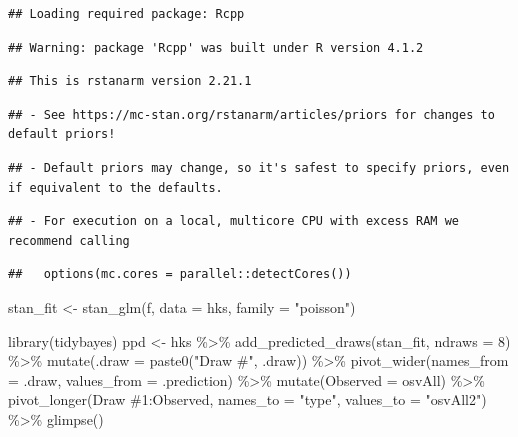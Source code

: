 \documentclass[
]{book}
\newenvironment{Shaded}{\begin{snugshade}}{\end{snugshade}}
\newcommand{\AttributeTok}[1]{\textcolor[rgb]{0.77,0.63,0.00}{#1}}
\newcommand{\DecValTok}[1]{\textcolor[rgb]{0.00,0.00,0.81}{#1}}
\newcommand{\FunctionTok}[1]{\textcolor[rgb]{0.00,0.00,0.00}{#1}}
\newcommand{\NormalTok}[1]{#1}
\newcommand{\OtherTok}[1]{\textcolor[rgb]{0.56,0.35,0.01}{#1}}
\newcommand{\SpecialCharTok}[1]{\textcolor[rgb]{0.00,0.00,0.00}{#1}}
\newcommand{\StringTok}[1]{\textcolor[rgb]{0.31,0.60,0.02}{#1}}
\begin{document}
\begin{verbatim}
## Loading required package: Rcpp
\end{verbatim}

\begin{verbatim}
## Warning: package 'Rcpp' was built under R version 4.1.2
\end{verbatim}

\begin{verbatim}
## This is rstanarm version 2.21.1
\end{verbatim}

\begin{verbatim}
## - See https://mc-stan.org/rstanarm/articles/priors for changes to default priors!
\end{verbatim}

\begin{verbatim}
## - Default priors may change, so it's safest to specify priors, even if equivalent to the defaults.
\end{verbatim}

\begin{verbatim}
## - For execution on a local, multicore CPU with excess RAM we recommend calling
\end{verbatim}

\begin{verbatim}
##   options(mc.cores = parallel::detectCores())
\end{verbatim}

\begin{Shaded}
\begin{Highlighting}[]
\NormalTok{stan\_fit }\OtherTok{\textless{}{-}} \FunctionTok{stan\_glm}\NormalTok{(f, }\AttributeTok{data =}\NormalTok{ hks, }\AttributeTok{family =} \StringTok{"poisson"}\NormalTok{)}

\FunctionTok{library}\NormalTok{(tidybayes)}
\NormalTok{ppd }\OtherTok{\textless{}{-}}\NormalTok{ hks }\SpecialCharTok{\%\textgreater{}\%}
  \FunctionTok{add\_predicted\_draws}\NormalTok{(stan\_fit, }\AttributeTok{ndraws =} \DecValTok{8}\NormalTok{) }\SpecialCharTok{\%\textgreater{}\%} 
  \FunctionTok{mutate}\NormalTok{(}\AttributeTok{.draw =} \FunctionTok{paste0}\NormalTok{(}\StringTok{"Draw \#"}\NormalTok{, .draw)) }\SpecialCharTok{\%\textgreater{}\%} 
  \FunctionTok{pivot\_wider}\NormalTok{(}\AttributeTok{names\_from =}\NormalTok{ .draw, }\AttributeTok{values\_from =}\NormalTok{ .prediction) }\SpecialCharTok{\%\textgreater{}\%}
  \FunctionTok{mutate}\NormalTok{(}\StringTok{\textasciigrave{}}\AttributeTok{Observed}\StringTok{\textasciigrave{}} \OtherTok{=}\NormalTok{ osvAll) }\SpecialCharTok{\%\textgreater{}\%} 
  \FunctionTok{pivot\_longer}\NormalTok{(}\StringTok{\textasciigrave{}}\AttributeTok{Draw \#1}\StringTok{\textasciigrave{}}\SpecialCharTok{:}\StringTok{\textasciigrave{}}\AttributeTok{Observed}\StringTok{\textasciigrave{}}\NormalTok{, }\AttributeTok{names\_to =} \StringTok{"type"}\NormalTok{, }\AttributeTok{values\_to =} \StringTok{"osvAll2"}\NormalTok{) }\SpecialCharTok{\%\textgreater{}\%}
  \FunctionTok{glimpse}\NormalTok{()}
\end{Highlighting}
\end{Shaded}
\end{document}

